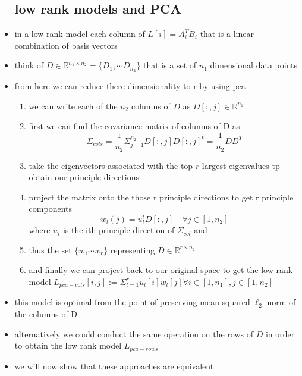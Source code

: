 \documentclass{article}
\begin{document}
\begin{itemize}
\subsection*{low rank models and PCA}
\item in a low rank model each column of $L[i]=A_{i}^{T}B_{i}$ that is a linear combination of basis vectors
\item think of  $D\in \mathbb{R}^{n_1\times n_2}=\{D_{1},\cdots D_{n_2}\}$ that is a set of $n_1$ dimensional data points 
\item from here we can reduce there dimensionality to r by using pca
\begin{enumerate}
    \item we can write each of the $n_2$ columns of $D$ as $D[:,j]\in \mathbb{R}^{n_1}$
    \item first we can find the covariance matrix of columns of D as  $$\Sigma_{cols}=\frac{1}{n_2}\Sigma_{j=1}^{n_2}D[:,j]D[:,j]^t=\frac{1}{n_2}DD^{T}$$
    \item take the eigenvectors associated with the top $r$ largest eigenvalues tp obtain our principle directions
    \item project the matrix onto the those r principle directions to get r principle components $$w_{l}(j)=u_{l}^{t}D[:,j] \quad \forall j\in [1,n_2] $$ where $u_i$ is the ith principle direction of $\Sigma_{col}$ and 
    \item thus the set $\{w_{1}\cdots w_{r} \}$ representing $D\in \mathbb{R}^{r\times n_2}$
    \item and finally we can project back to our original space to get the low rank model $L_{pca-cols}[i,j]:=\Sigma_{l=1}^{r}u_{l}[i]w_{l}[j] \forall i\in [1,n_1], j\in [1,n_2]$
\end{enumerate}
\item this model is optimal from the point of preserving mean squared $\ell_{2}$ norm of the columns of D
\item alternatively we could conduct the same operation on the rows of $D$ in order to obtain the low rank model $L_{pca-rows}$
\item we will now show that these approaches are equivalent 

\end{itemize}
\end{document}
